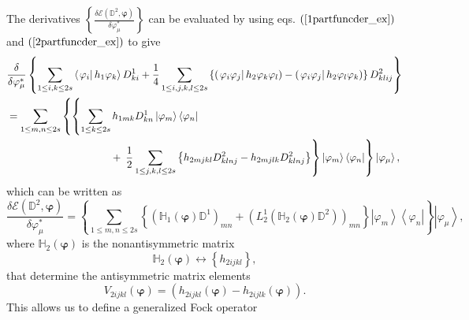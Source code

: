 \documentclass{preprint}
\begin{document}
The derivatives $\left\{ \frac{\delta \mathcal{E}\left( \mathbb{D}^{2},%
\bm{\varphi}\right) }{\delta \varphi _{\mu }^{\ast }}\right\} $ can be
evaluated by using eqs. $\left( \ref{1partfuncder_ex}\right) $ and $\left( %
\ref{2partfuncder_ex}\right) $ to give
\begin{align}
& \frac{\delta }{\delta \varphi _{\mu }^{\ast }}\left\{ \sum_{1\leq i,k\leq
2s}\left\langle \left. \varphi _{i}\right\vert h_{1}\varphi
_{k}\right\rangle D_{ki}^{1}+\frac{1}{4}\sum_{1\leq i,j,k,l\leq 2s}\left\{
\left( \left. \varphi _{i}\varphi _{j}\right\vert h_{2}\varphi _{k}\varphi
_{l}\right) -\left( \left. \varphi _{i}\varphi _{j}\right\vert h_{2}\varphi
_{l}\varphi _{k}\right) \right\} D_{klij}^{2}\right\}  \notag \\
& =\sum_{1\leq m,n\leq 2s}\left\{ \left\{ \sum_{1\leq k\leq
2s}h_{1mk}D_{kn}^{1}\left\vert \varphi _{m}\right\rangle \left\langle
\varphi _{n}\right\vert \right. \right.  \notag \\
& \qquad \qquad \qquad \qquad \qquad +\left. \left. \frac{1}{2}\sum_{1\leq
j,k,l\leq 2s}\left\{ h_{2mjkl}D_{klnj}^{2}-h_{2mjlk}D_{klnj}^{2}\right\}
\right\} \left\vert \varphi _{m}\right\rangle \left\langle \varphi
_{n}\right\vert \right\} \left\vert \varphi _{\mu }\right\rangle ,
\end{align}%
which can be written as
\begin{equation}
\frac{\delta \mathcal{E}\left( \mathbb{D}^{2},\bm{\varphi}\right) }{\delta
\varphi _{\mu }^{\ast }}=\left\{ \sum_{1\leq m,n\leq 2s}\left\{ \left(
\mathbb{H}_{1}\left( \bm{\varphi}\right) \mathbb{D}^{1}\right) _{mn}+\left(
L_{2}^{1}\left( \mathbb{H}_{2}\left( \bm{\varphi}\right) \mathbb{D}%
^{2}\right) \right) _{mn}\right\} \left\vert \varphi _{m}\right\rangle
\left\langle \varphi _{n}\right\vert \right\} \left\vert \varphi _{\mu
}\right\rangle ,
\end{equation}%
where $\mathbb{H}_{2}\left( \bm{\varphi}\right) $ is the nonantisymmetric
matrix
\begin{equation}
\mathbb{H}_{2}\left( \bm{\varphi}\right) \leftrightarrow \left\{
h_{2ijkl}\right\} ,
\end{equation}%
that determine the antisymmetric matrix elements
\begin{equation}
V_{2ijkl}\left( \bm{\varphi}\right) =\left( h_{2ijkl}\left( \bm{\varphi}%
\right) -h_{2ijlk}\left( \bm{\varphi}\right) \right) .
\end{equation}%
This allows us to define a generalized Fock operator
\end{document}
